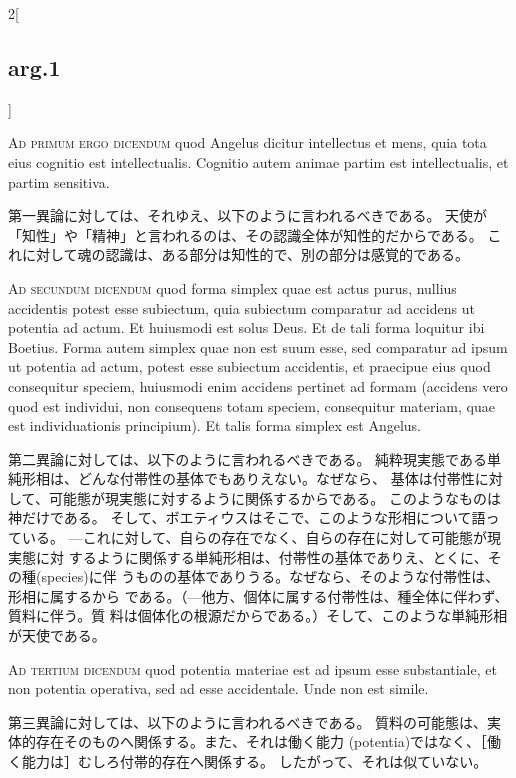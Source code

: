 \documentclass[paper=a4paper,fontsize=10pt,jafontsize=9pt,titlepage]{jlreq}
\begin{document}
\begin{paracol}{2}[\subsection{arg.1}]
\switchcolumn*[\subsection{ad.1}]

{\scshape Ad primum ergo dicendum} quod Angelus dicitur
intellectus et mens, quia tota eius cognitio est
intellectualis. Cognitio autem animae partim est intellectualis, et
partim sensitiva.

\switchcolumn

第一異論に対しては、それゆえ、以下のように言われるべきである。
天使が「知性」や「精神」と言われるのは、その認識全体が知性的だからである。
 これに対して魂の認識は、ある部分は知性的で、別の部分は感覚的である。

\switchcolumn*[\subsection{ad.2}]

{\scshape Ad secundum dicendum} quod forma simplex quae
est actus purus, nullius accidentis potest esse subiectum, quia
subiectum comparatur ad accidens ut potentia ad actum. Et huiusmodi est
solus Deus. Et de tali forma loquitur ibi Boetius. Forma autem simplex
quae non est suum esse, sed comparatur ad ipsum ut potentia ad actum,
potest esse subiectum accidentis, et praecipue eius quod consequitur
speciem, huiusmodi enim accidens pertinet ad formam (accidens vero quod
est individui, non consequens totam speciem, consequitur materiam, quae
est individuationis principium). Et talis forma simplex est Angelus.

\switchcolumn

第二異論に対しては、以下のように言われるべきである。
純粋現実態である単純形相は、どんな付帯性の基体でもありえない。なぜなら、
 基体は付帯性に対して、可能態が現実態に対するように関係するからである。
このようなものは神だけである。
そして、ボエティウスはそこで、このような形相について語っている。
---これに対して、自らの存在でなく、自らの存在に対して可能態が現実態に対
 するように関係する単純形相は、付帯性の基体でありえ、とくに、その種(species)に伴
 うものの基体でありうる。なぜなら、そのような付帯性は、形相に属するから
 である。（---他方、個体に属する付帯性は、種全体に伴わず、質料に伴う。質
 料は個体化の根源だからである。）そして、このような単純形相が天使である。

\switchcolumn*[\subsection{ad.3}]

{\scshape Ad tertium dicendum} quod potentia materiae
est ad ipsum esse substantiale, et non potentia operativa, sed ad esse
accidentale. Unde non est simile.

\switchcolumn

第三異論に対しては、以下のように言われるべきである。
質料の可能態は、実体的存在そのものへ関係する。また、それは働く能力
 (potentia)ではなく、［働く能力は］むしろ付帯的存在へ関係する。
したがって、それは似ていない。

\end{paracol}
\end{document}
